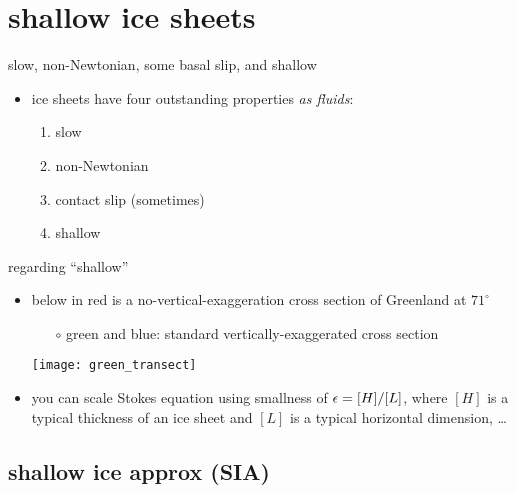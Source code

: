 
\section{shallow ice sheets}

\begin{frame}{slow, non-Newtonian, some basal slip, and shallow}

\begin{itemize}
\item ice sheets have four outstanding properties \emph{as fluids}:
  \begin{enumerate}
  \item slow
  \item non-Newtonian
  \item contact slip (sometimes)
  \item shallow
  \end{enumerate}
\end{itemize}
\end{frame}


\begin{frame}{regarding ``shallow''}

\begin{itemize}
\item below in \alert{red} is a no-vertical-exaggeration cross section of Greenland at $71^\circ$
\small
  \begin{itemize}
  \item[$\circ$] green and blue: standard vertically-exaggerated cross section
  \end{itemize}
  \begin{center}
    \texttt{[image: green\_transect]}
  \end{center}
\item you can scale Stokes equation using smallness of $\epsilon = [H]/[L]$, where $[H]$ is a typical thickness of an ice sheet and $[L]$ is a typical horizontal dimension, \dots
\end{itemize}
\end{frame}


\subsection{shallow ice approx (SIA)}

